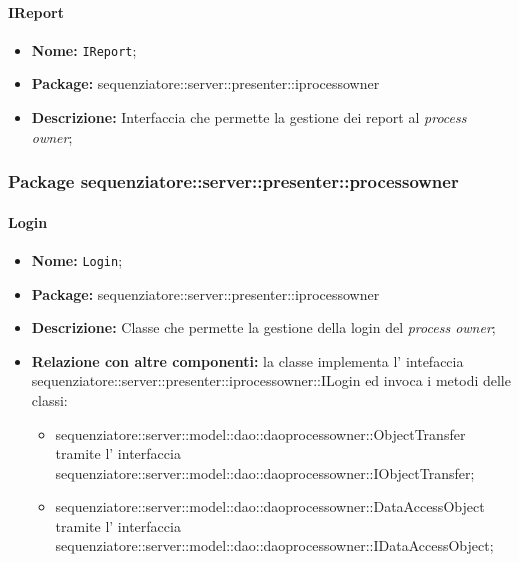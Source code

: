 \paragraph{IReport}
	\begin{itemize}
		\item \textbf{Nome:} \texttt{IReport};
		\item \textbf{Package:} sequenziatore::server::presenter::iprocessowner
		\item \textbf{Descrizione:} Interfaccia che permette la gestione dei report al \textit{process owner};
	\end{itemize}

\subsubsection{Package sequenziatore::server::presenter::processowner}
\paragraph{Login}
	\begin{itemize}
		\item \textbf{Nome:} \texttt{Login};
		\item \textbf{Package:} sequenziatore::server::presenter::iprocessowner
		\item \textbf{Descrizione:} Classe che permette la gestione della login del \textit{process owner};
		\item \textbf{Relazione con altre componenti:} la classe implementa l' intefaccia sequenziatore::server::presenter::iprocessowner::ILogin ed invoca i metodi delle classi:
		\begin{itemize}
			\item sequenziatore::server::model::dao::daoprocessowner::ObjectTransfer tramite l' interfaccia sequenziatore::server::model::dao::daoprocessowner::IObjectTransfer;
			\item sequenziatore::server::model::dao::daoprocessowner::DataAccessObject tramite l' interfaccia sequenziatore::server::model::dao::daoprocessowner::IDataAccessObject;
		\end{itemize}
	\end{itemize}

